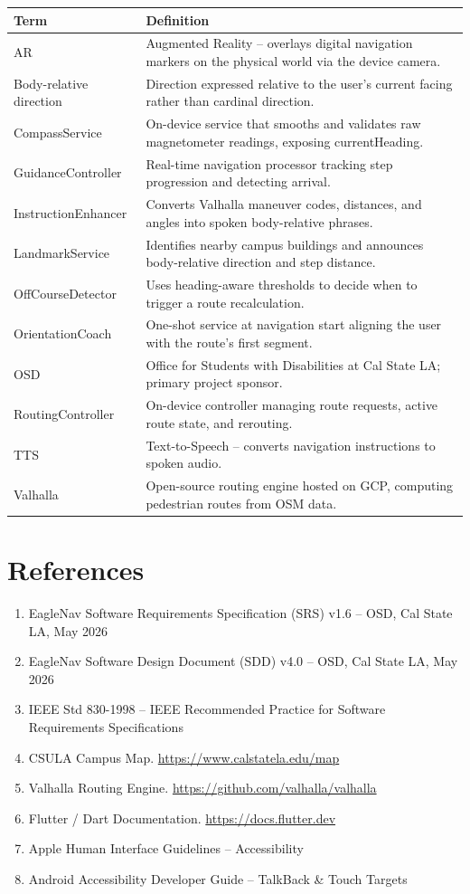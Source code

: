 \documentclass[12pt]{article}
\begin{document}
\begin{tabularx}{\textwidth}{|l|X|}
\hline
\textbf{Term} & \textbf{Definition} \\
\hline
AR & Augmented Reality -- overlays digital navigation markers on the physical world via the device camera. \\
\hline
Body-relative direction & Direction expressed relative to the user's current facing rather than cardinal direction. \\
\hline
CompassService & On-device service that smooths and validates raw magnetometer readings, exposing currentHeading. \\
\hline
GuidanceController & Real-time navigation processor tracking step progression and detecting arrival. \\
\hline
InstructionEnhancer & Converts Valhalla maneuver codes, distances, and angles into spoken body-relative phrases. \\
\hline
LandmarkService & Identifies nearby campus buildings and announces body-relative direction and step distance. \\
\hline
OffCourseDetector & Uses heading-aware thresholds to decide when to trigger a route recalculation. \\
\hline
OrientationCoach & One-shot service at navigation start aligning the user with the route's first segment. \\
\hline
OSD & Office for Students with Disabilities at Cal State LA; primary project sponsor. \\
\hline
RoutingController & On-device controller managing route requests, active route state, and rerouting. \\
\hline
TTS & Text-to-Speech -- converts navigation instructions to spoken audio. \\
\hline
Valhalla & Open-source routing engine hosted on GCP, computing pedestrian routes from OSM data. \\
\hline
\end{tabularx}

\section{References}

\begin{enumerate}
    \item EagleNav Software Requirements Specification (SRS) v1.6 -- OSD, Cal State LA, May 2026
    \item EagleNav Software Design Document (SDD) v4.0 -- OSD, Cal State LA, May 2026
    \item IEEE Std 830-1998 -- IEEE Recommended Practice for Software Requirements Specifications
    \item CSULA Campus Map. \url{https://www.calstatela.edu/map}
    \item Valhalla Routing Engine. \url{https://github.com/valhalla/valhalla}
    \item Flutter / Dart Documentation. \url{https://docs.flutter.dev}
    \item Apple Human Interface Guidelines -- Accessibility
    \item Android Accessibility Developer Guide -- TalkBack \& Touch Targets
\end{enumerate}
\end{document}
